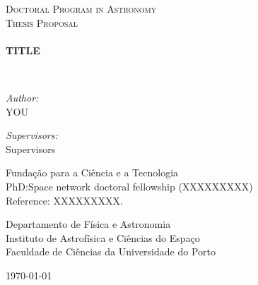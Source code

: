 \begin{titlepage}
\begin{center}


\textsc{\LARGE Doctoral Program in Astronomy}\\[1.5cm]

\textsc{\Large Thesis Proposal}\\[0.5cm]

~\\[0.4cm]

{ \Large \bfseries TITLE \\[0.4cm] }

~\\[1.5cm]

\begin{minipage}{0.5\textwidth}
\begin{flushleft} \large
\emph{Author:}\\
YOU
\end{flushleft}
\end{minipage}
\begin{minipage}{0.4\textwidth}
\begin{flushright} \large
\emph{Supervisors:} \\
Supervisors
\end{flushright}
\end{minipage}

\vfill 

{\large 
    Funda\c{c}\~{a}o para a Ci\^encia e a Tecnologia\\[.2cm]
    PhD:Space network doctoral fellowship (XXXXXXXXX)\\[.2cm]
    Reference: XXXXXXXXX.}

\vfill

{\large
Departamento de Física e Astronomia\\[.2cm]
Instituto de Astrofísica e Ciências do Espaço\\[.3cm]
Faculdade de Ciências da Universidade do Porto
}

\vfill

{\large \today}

\end{center}
\end{titlepage}